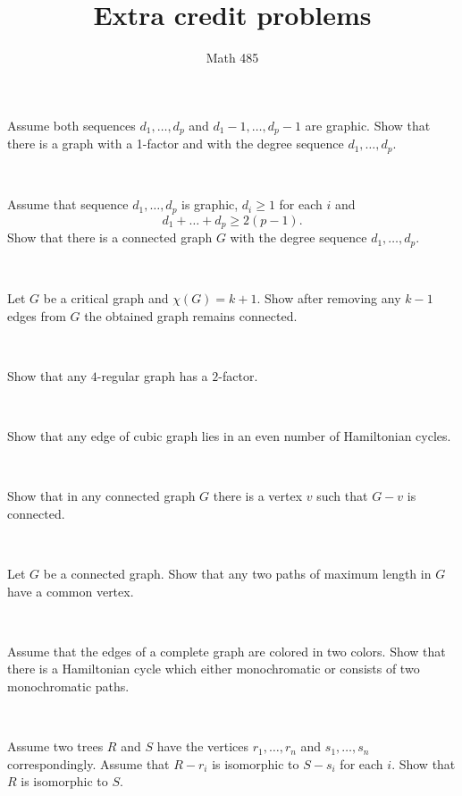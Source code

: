 \documentclass[oneside,a4paper]{article}
\begin{document}
%
\title{Extra credit problems}
\author{Math 485}
\date{}
\maketitle

\textit{}


Assume both sequences $d_1,\dots, d_p$
 and $d_1-1,\dots, d_p-1$ are graphic.
Show that there is a graph with a 1-factor and with the degree sequence $d_1,\dots, d_p$.

\ 

Assume that sequence $d_1,\dots, d_p$ is graphic,
$d_i\ge 1$ for each $i$ and 
\[d_1+\dots+d_p\ge 2(p-1).\]
Show that there is a connected graph $G$ with the degree sequence $d_1,\dots, d_p$.

\ 

Let $G$ be a critical graph and $\chi(G)=k+1$.
Show after removing any $k-1$ edges from $G$  
the obtained graph remains connected. 

\ 

Show that any $4$-regular graph has a $2$-factor.

\ 

Show that any edge of cubic graph lies in an even number of Hamiltonian cycles.

\ 

Show that in any connected graph $G$ there is a vertex $v$ such that $G-v$ is connected.

\ 

Let $G$ be a  connected graph.
Show that any two paths of maximum length in $G$ have a common vertex.

\ 

Assume that the edges of a complete graph are colored in two colors.
Show that there is a Hamiltonian cycle which either monochromatic or consists of two monochromatic paths.

\ 

Assume two trees $R$ and $S$ 
have the vertices $r_1,\dots,r_n$ and $s_1,\dots,s_n$ correspondingly.
Assume that $R-r_i$ is isomorphic to $S-s_i$ for each $i$.
Show that $R$ is isomorphic to $S$.
\end{document}
